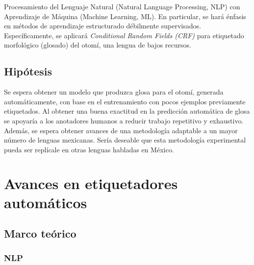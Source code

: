 \documentclass[letterpaper,12pt,oneside]{book}
\begin{document}
	Procesamiento del Lenguaje Natural (Natural Language Processing, NLP) con Aprendizaje de Máquina (Machine Learning, ML). En particular, se hará énfasis en métodos de aprendizaje estructurado débilmente supervisados. Específicamente, se aplicará \textit{Conditional Random Fields (CRF)} para etiquetado morfológico (glosado) del otomí, una lengua de bajos recursos.

	
	\section{Hipótesis}

	
	Se espera obtener un modelo que produzca glosa para el otomí, generada automáticamente, con base en el entrenamiento con pocos ejemplos previamente etiquetados. Al obtener una buena exactitud en la predicción automática de glosa se apoyaría a los anotadores humanos a reducir trabajo repetitivo y exhaustivo. Además, se espera obtener avances de una metodología adaptable a un mayor número de lenguas mexicanas. Sería deseable que esta metodología experimental pueda ser replícale en otras lenguas habladas en México.

	
	\chapter{Avances en etiquetadores automáticos}

	

	
	\section{Marco teórico}

	












	
	\subsection{NLP}
\end{document}
